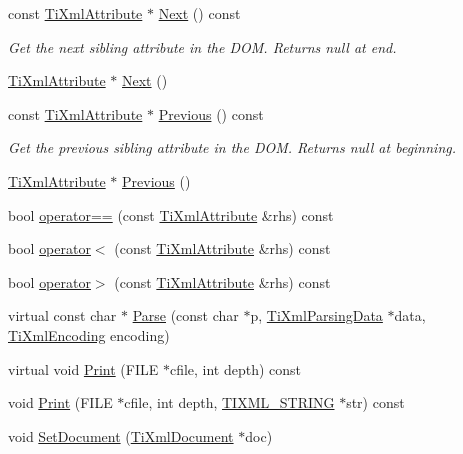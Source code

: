 \begin{DoxyCompactItemize}
const \hyperlink{class_ti_xml_attribute}{Ti\+Xml\+Attribute} $\ast$ \hyperlink{class_ti_xml_attribute_a776478980776a024f7c2846eec640f65}{Next} () const 
\begin{DoxyCompactList}\small\item\em Get the next sibling attribute in the D\+O\+M. Returns null at end. \end{DoxyCompactList}\item 
\hyperlink{class_ti_xml_attribute}{Ti\+Xml\+Attribute} $\ast$ \hyperlink{class_ti_xml_attribute_a138320aa7793b148ba7e5bd0a0ea4db6}{Next} ()
\item 
const \hyperlink{class_ti_xml_attribute}{Ti\+Xml\+Attribute} $\ast$ \hyperlink{class_ti_xml_attribute_a54a5f8730c7b02b9a41b74e12e27fe86}{Previous} () const 
\begin{DoxyCompactList}\small\item\em Get the previous sibling attribute in the D\+O\+M. Returns null at beginning. \end{DoxyCompactList}\item 
\hyperlink{class_ti_xml_attribute}{Ti\+Xml\+Attribute} $\ast$ \hyperlink{class_ti_xml_attribute_ae4dabc932cba945ed1e92fec5f121193}{Previous} ()
\item 
bool \hyperlink{class_ti_xml_attribute_ae48c2a65b520d453914ce4e845d607cf}{operator==} (const \hyperlink{class_ti_xml_attribute}{Ti\+Xml\+Attribute} \&rhs) const 
\item 
bool \hyperlink{class_ti_xml_attribute_adb8b6f2cad5948e73e383182e7ce10de}{operator$<$} (const \hyperlink{class_ti_xml_attribute}{Ti\+Xml\+Attribute} \&rhs) const 
\item 
bool \hyperlink{class_ti_xml_attribute_a867562769ef9778c1690cd373246b05b}{operator$>$} (const \hyperlink{class_ti_xml_attribute}{Ti\+Xml\+Attribute} \&rhs) const 
\item 
virtual const char $\ast$ \hyperlink{class_ti_xml_attribute_ad62774421b814894b995af3b5d231dda}{Parse} (const char $\ast$p, \hyperlink{class_ti_xml_parsing_data}{Ti\+Xml\+Parsing\+Data} $\ast$data, \hyperlink{tinyxml_8h_a88d51847a13ee0f4b4d320d03d2c4d96}{Ti\+Xml\+Encoding} encoding)
\item 
virtual void \hyperlink{class_ti_xml_attribute_acc04956c1d5c4c31fe74f7a7528d109a}{Print} (F\+I\+L\+E $\ast$cfile, int depth) const 
\item 
void \hyperlink{class_ti_xml_attribute_a19e6b6862a80b188571c47947e88d030}{Print} (F\+I\+L\+E $\ast$cfile, int depth, \hyperlink{tinyxml_8h_a92bada05fd84d9a0c9a5bbe53de26887}{T\+I\+X\+M\+L\+\_\+\+S\+T\+R\+I\+N\+G} $\ast$str) const 
\item 
void \hyperlink{class_ti_xml_attribute_ac12a94d4548302afb12f488ba101f7d1}{Set\+Document} (\hyperlink{class_ti_xml_document}{Ti\+Xml\+Document} $\ast$doc)
\end{DoxyCompactItemize}
